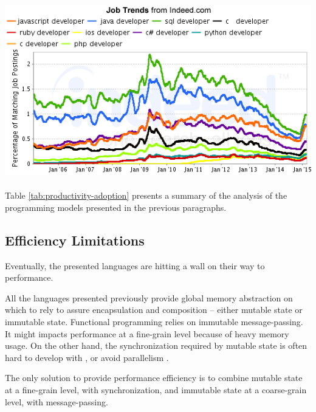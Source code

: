 \includegraphics[width=0.9\linewidth]{../../data/js-trends/jobgraph}

\paragraph{}

Table \ref{tab:productivity-adoption} presents a summary of the analysis of the programming models presented in the previous paragraphs.


\subsection{Efficiency Limitations} \label{chapter3:software-productivity:efficiency-limitations}

Eventually, the presented languages are hitting a wall on their way to performance.

All the languages presented previously provide global memory abstraction on which to rely to assure encapsulation and composition -- either mutable state or immutable state.
Functional programming relies on immutable message-passing.
It might impacts performance at a fine-grain level because of heavy memory usage.
On the other hand, the synchronization required by mutable state is often hard to develop with \cite{Adya2002}, or avoid parallelism \cite{Pai1999,Krohn2007}.

The only solution to provide performance efficiency is to combine mutable state at a fine-grain level, with synchronization, and immutable state at a coarse-grain level, with message-passing.



